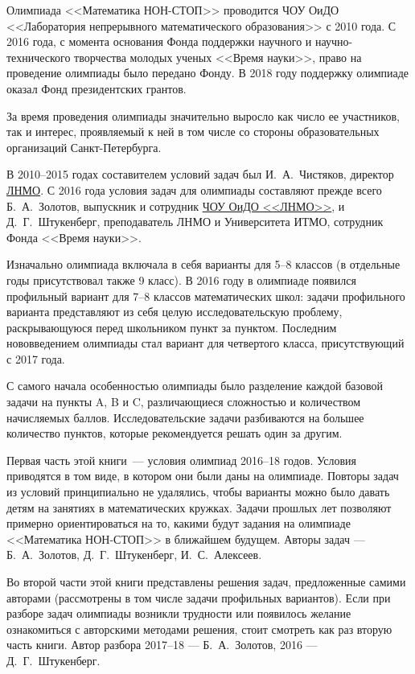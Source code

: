 \noindent\abz Олимпиада <<Математика НОН-СТОП>> проводится \hypertarget{lcme}{ЧОУ ОиДО <<Лаборатория непрерывного математического образования>>} с 2010 года. С 2016 года, с момента основания Фонда поддержки научного и научно-технического творчества молодых ученых <<Время науки>>, право на проведение олимпиады было передано Фонду. В 2018 году поддержку олимпиаде оказал Фонд президентских грантов. 

\aabz За время проведения олимпиады значительно выросло как число ее участников, так и интерес, проявляемый к ней в том числе со стороны образовательных организаций Санкт-Петербурга.

\aabz В 2010--2015 годах составителем условий задач был И.~А.~Чистяков, директор \hyperlink{lcme}{ЛНМО}. С 2016 года условия задач для олимпиады составляют прежде всего Б.~А.~Золотов, выпускник и сотрудник \hyperlink{lcme}{ЧОУ ОиДО <<ЛНМО>>}, и Д.~Г.~Штукенберг, преподаватель ЛНМО и Университета ИТМО, сотрудник Фонда <<Время науки>>.

\aabz Изначально олимпиада включала в себя варианты для 5--8 классов (в отдельные годы присутствовал также 9 класс). В 2016 году в олимпиаде появился профильный вариант для 7--8 классов математических школ: задачи профильного варианта представляют из себя целую исследовательскую проблему, раскрывающуюся перед школьником пункт за пунктом.  Последним нововведением олимпиады стал вариант для четвертого класса, присутствующий с 2017 года.

\aabz С самого начала особенностью олимпиады было разделение каждой базовой задачи на пункты A, B и C, различающиеся сложностью и количеством начисляемых баллов. Исследовательские задачи разбиваются на большее количество пунктов, которые рекомендуется решать один за другим.

\aabz Первая часть этой книги~--- условия олимпиад 2016--18 годов. Условия приводятся в том виде, в котором они были даны на олимпиаде. 
Повторы задач из условий принципиально не удалялись, чтобы варианты можно было давать детям на занятиях в математических кружках. Задачи прошлых лет позволяют примерно ориентироваться на то, какими будут задания на олимпиаде <<Математика НОН-СТОП>> в ближайшем будущем. Авторы задач — Б.~А.~Золотов, Д.~Г.~Штукенберг, И.~С.~Алексеев.

\aabz Во второй части этой книги представлены решения задач, предложенные самими авторами (рассмотрены в том числе задачи профильных вариантов). Если при разборе задач олимпиады возникли трудности или появилось желание ознакомиться с авторскими методами решения, стоит смотреть как раз вторую часть книги. Автор разбора 2017–18 — Б.~А.~Золотов, 2016 — Д.~Г.~Штукенберг.

